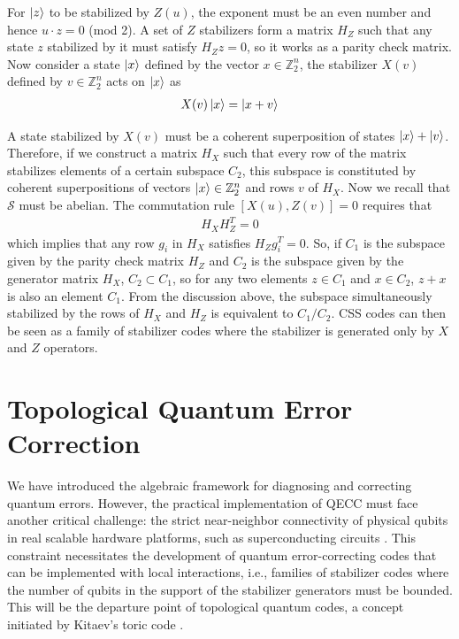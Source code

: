 \documentclass[12pt, twoside, openany]{book}
\begin{document}
For $\ket{z}$ to be stabilized by $Z(u)$, the exponent must be an even number and hence $u \cdot z = 0$ (mod 2). A set of $Z$ stabilizers form a matrix $H_Z$ such that any state $z$ stabilized by it must satisfy $H_Z z = 0$, so it works as a parity check matrix. Now consider a state $\ket{x}$ defined by the vector $x \in \mathbb{Z}^n_2$, the stabilizer $X(v)$ defined by $v \in \mathbb{Z}^n_2$ acts on $\ket{x}$ as
\begin{align*}
    X(v) \ket{x} = \ket{x + v} 
\end{align*}

A state stabilized by $X(v)$ must be a coherent superposition of states $\ket{x} + \ket{v}$. Therefore, if we construct a matrix $H_X$ such that every row of the matrix stabilizes elements of a certain subspace $C_2$, this subspace is constituted by coherent superpositions of vectors $\ket{x} \in \mathbb{Z}^n_2$ and rows $v$ of $H_X$. Now we recall that $\mathcal{S}$ must be abelian. The commutation rule $[X(u),Z(v)] = 0$ requires that 
\begin{align} \label{commutationCSS}
    H_X H_Z^T = 0
\end{align}
which implies that any row $g_i$ in $H_X$ satisfies $H_Z g_i^T = 0$. So, if $C_1$ is the subspace given by the parity check matrix $H_Z$ and $C_2$ is the subspace given by the generator matrix $H_X$, $C_2 \subset C_1$, so for any two elements $z \in C_1$ and $x \in C_2$, $z+x$ is also an element $C_1$. From the discussion above, the subspace simultaneously stabilized by the rows of $H_X$ and $H_Z$ is equivalent to $C_1 / C_2$. CSS codes can then be seen as a family of stabilizer codes where the stabilizer is generated only by $X$ and $Z$ operators. 

\chapter{Topological Quantum Error Correction} \label{ch:TQEC}

We have introduced the algebraic framework for diagnosing and correcting quantum errors. However, the practical implementation of QECC must face another critical challenge: the strict near-neighbor connectivity of physical qubits in real scalable hardware platforms, such as superconducting circuits \cite{QuantumSupremacy2019} \cite{Het_nyi_2024}. This constraint necessitates the development of quantum error-correcting codes that can be implemented with local interactions, i.e., families of stabilizer codes where the number of qubits in the support of the stabilizer generators must be bounded. This will be the departure point of topological quantum codes, a concept initiated by Kitaev's toric code \cite{Kitaev2003}.\\
\end{document}
